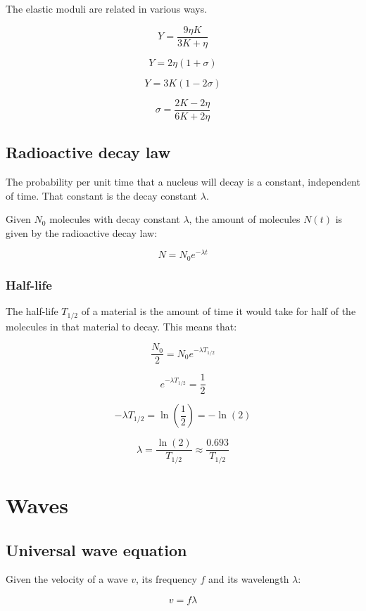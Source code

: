 \documentclass[12pt]{article}
\begin{document}
The elastic moduli are related in various ways.

\[
\boxed{
Y = \frac{9 \eta K}{3K + \eta}
}
\]

\[
\boxed{
Y = 2 \eta (1 + \sigma)
}
\]

\[
\boxed{
Y = 3K(1 - 2\sigma)
}
\]

\[
\boxed{
\sigma = \frac{2K - 2\eta}{6K + 2\eta}
}
\]

\subsection{Radioactive decay law}

The probability per unit time that a nucleus will decay is a constant, independent of time.
That constant is the decay constant $\lambda$.

Given $N_0$ molecules with decay constant $\lambda$, the amount of molecules $N(t)$ is given by the radioactive decay law:

\[
\boxed{
N = N_0 e^{-\lambda t}
}
\]

\subsubsection{Half-life}

The half-life $T_{1/2}$ of a material is the amount of time it would take for half of the molecules in that material to decay.
This means that:

\[
\frac{N_0}{2} = N_0 e^{-\lambda T_{1/2}}
\]

\[
e^{-\lambda T_{1/2}} = \frac{1}{2}
\]

\[
-\lambda T_{1/2} = \ln\left(\frac{1}{2}\right) = -\ln\left(2\right)
\]

\[
\boxed{
\lambda = \frac{\ln(2)}{T_{1/2}} \approx \frac{0.693}{T_{1/2}}
}
\]

\newpage

\section{Waves}

\subsection{Universal wave equation}

Given the velocity of a wave $v$, its frequency $f$ and its wavelength $\lambda$:

\[
\boxed{
v = f\lambda
}
\]
\end{document}
